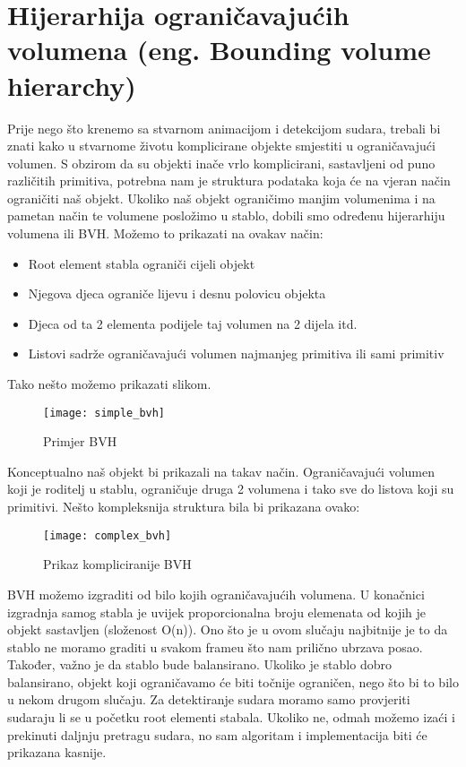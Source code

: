 \chapter{Hijerarhija ograničavajućih volumena (eng. Bounding volume hierarchy)}\label{cha:BVH}
Prije nego što krenemo sa stvarnom animacijom i detekcijom sudara, trebali bi znati kako u stvarnome životu komplicirane objekte smjestiti u ograničavajući volumen. S obzirom da su objekti inače vrlo komplicirani, sastavljeni od puno različitih primitiva, potrebna nam je struktura podataka koja će na vjeran način ograničiti naš objekt. Ukoliko naš objekt ograničimo manjim volumenima i na pametan način te volumene posložimo u stablo, dobili smo određenu hijerarhiju volumena ili BVH. Možemo to prikazati na ovakav način:
\begin{itemize}
	\item Root element stabla ograniči cijeli objekt
	\item Njegova djeca ograniče lijevu i desnu polovicu objekta
	\item Djeca od ta 2 elementa podijele taj volumen na 2 dijela itd.
	\item Listovi sadrže ograničavajući volumen najmanjeg primitiva ili sami primitiv
\end{itemize}
Tako nešto možemo prikazati slikom.
\newpage
\begin{figure}[!http]
		\begin{center}
			\texttt{[image: simple\_bvh]}
			\caption{Primjer BVH\cite{4}}
			\label{fig:6}
		\end{center}
\end{figure}
Konceptualno naš objekt bi prikazali na takav način. Ograničavajući volumen koji je roditelj u stablu, ograničuje druga 2 volumena i tako sve do listova koji su primitivi. Nešto kompleksnija struktura bila bi prikazana ovako:
\begin{figure}[!http]
	\begin{center}
		\texttt{[image: complex\_bvh]}
		\caption{Prikaz kompliciranije BVH \cite{4}}
		\label{fig:7}
	\end{center}
	\end{figure}
BVH možemo izgraditi od bilo kojih ograničavajućih volumena. U konačnici izgradnja samog stabla je uvijek proporcionalna broju elemenata od kojih je objekt sastavljen (složenost O(n))\cite{1}. Ono što je u ovom slučaju najbitnije je to da stablo ne moramo graditi u svakom frameu što nam prilično ubrzava posao. Također, važno je da stablo bude balansirano. Ukoliko je stablo dobro balansirano, objekt koji ograničavamo će biti točnije ograničen, nego što bi to bilo u nekom drugom slučaju. Za detektiranje sudara moramo samo provjeriti sudaraju li se u početku root elementi stabala. Ukoliko ne, odmah možemo izaći i prekinuti daljnju pretragu sudara, no sam algoritam i implementacija biti će prikazana kasnije.
	
